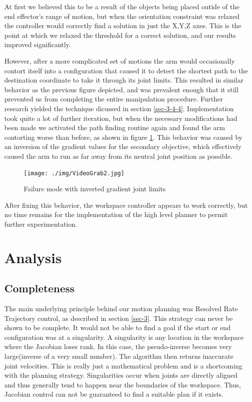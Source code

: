 \documentclass[10pt, conference]{IEEEtran}
\begin{document}
  At first we believed this to be a result of the objects being placed
  outide of the end effector's range of motion, but when the orientation
  constraint was relaxed the controller would correctly find a solution
  in just the X,Y,Z axes. This is the point at which we relaxed the
  threshold for a correct solution, and our results improved
  significantly.

  However, after a more complicated set of motions the arm would
  occasionally contort itself into a configuration that caused it to
  detect the shortest path to the destination coordinate to take it
  through its joint limits. This resulted in similar behavior as the
  previous figure depicted, and was prevalent enough that it still
  prevented us from completing the entire manipulation
  procedure. Further research yielded the technique dicussed in section
  \ref{sec-3-4-4}. Implementation took quite a lot of further
  iteration, but when the necessary modifications had been made we
  activated the path finding routine again and found the arm contorting
  worse than before, as shown in figure \ref{fig:scaryjoints}. This
  behavior was caused by an inversion of the gradient values for the
  secondary objective, which effectively caused the arm to run as far
  away from its neutral joint position as possible.

  \begin{figure}[htb]
  \centering
  \texttt{[image: ./img/VideoGrab2.jpg]}
  \caption{\label{fig:scaryjoints}Failure mode with inverted gradient joint limits}
  \end{figure}

  After fixing this behavior, the workspace controller appears to work
  correctly, but no time remains for the implementation of the high
  level planner to permit further experimentation.
\section{Analysis}
\label{sec-5}
\subsection{Completeness}
\label{sec-5-1}

   The main underlying principle behind our motion planning was Resolved
   Rate Trajectory control, as described in section \ref{sec-3}.  This
   strategy can never be shown to be complete. It would not be able to
   find a goal if the start or end configuration was at a singularity. A
   singularity is any location in the workspace where the Jacobian loses
   rank. In this case, the pseudo-inverse becomes very large(inverse of
   a very small number). The algorithm then returns inaccurate joint
   velocities. This is really just a mathematical problem and is a
   shortcoming with the planning strategy. Singularities occur when
   joints are directly aligned and thus generally tend to happen near
   the boundaries of the workspace. Thus, Jacobian control can not be
   guaranteed to find a suitable plan if it exists.
\end{document}
